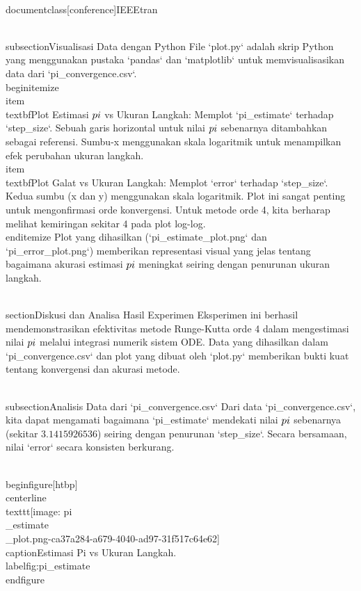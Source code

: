 \\documentclass[conference]{IEEEtran}
\begin{document}
\\subsection{Visualisasi Data dengan Python}
File `plot.py` adalah skrip Python yang menggunakan pustaka `pandas` dan `matplotlib` untuk memvisualisasikan data dari `pi_convergence.csv`.
\\begin{itemize}
\\item \\textbf{Plot Estimasi $\\pi$ vs Ukuran Langkah}: Memplot `pi_estimate` terhadap `step_size`. Sebuah garis horizontal untuk nilai $\\pi$ sebenarnya ditambahkan sebagai referensi. Sumbu-x menggunakan skala logaritmik untuk menampilkan efek perubahan ukuran langkah.
\\item \\textbf{Plot Galat vs Ukuran Langkah}: Memplot `error` terhadap `step_size`. Kedua sumbu (x dan y) menggunakan skala logaritmik. Plot ini sangat penting untuk mengonfirmasi orde konvergensi. Untuk metode orde 4, kita berharap melihat kemiringan sekitar 4 pada plot log-log.
\\end{itemize}
Plot yang dihasilkan (`pi_estimate_plot.png` dan `pi_error_plot.png`) memberikan representasi visual yang jelas tentang bagaimana akurasi estimasi $\\pi$ meningkat seiring dengan penurunan ukuran langkah.

\\section{Diskusi dan Analisa Hasil Experimen}
Eksperimen ini berhasil mendemonstrasikan efektivitas metode Runge-Kutta orde 4 dalam mengestimasi nilai $\\pi$ melalui integrasi numerik sistem ODE. Data yang dihasilkan dalam `pi_convergence.csv` dan plot yang dibuat oleh `plot.py` memberikan bukti kuat tentang konvergensi dan akurasi metode.

\\subsection{Analisis Data dari `pi_convergence.csv`}
Dari data `pi_convergence.csv`, kita dapat mengamati bagaimana `pi_estimate` mendekati nilai $\\pi$ sebenarnya (sekitar $3.1415926536$) seiring dengan penurunan `step_size`. Secara bersamaan, nilai `error` secara konsisten berkurang.

\\begin{figure}[htbp]
\\centerline{\\texttt{[image: pi\\\_estimate\\\_plot.png-ca37a284-a679-4040-ad97-31f517c64e62]}}
\\caption{Estimasi Pi vs Ukuran Langkah.}
\\label{fig:pi\_estimate}
\\end{figure}
\end{document}
